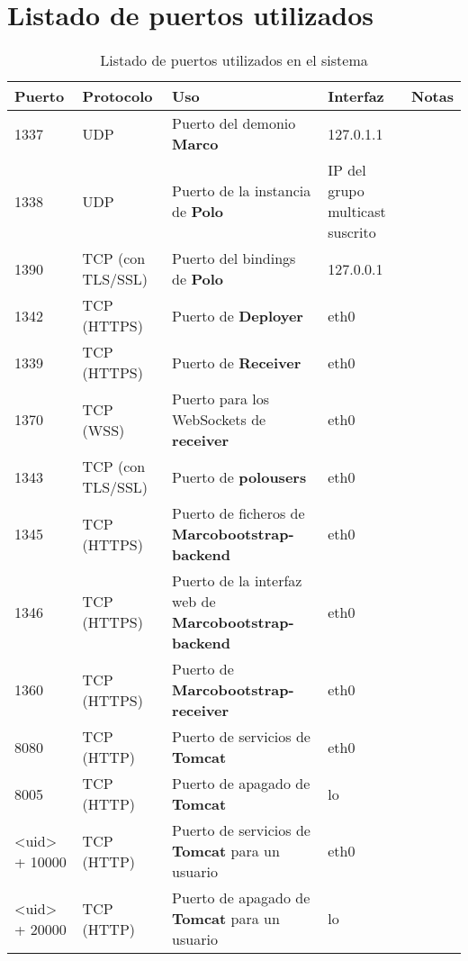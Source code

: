 \chapter{Listado de puertos utilizados}

\begin{table}[H]
\centering
\begin{tabular}{|p{1.5cm}|p{2.5cm}|p{5cm}|p{2.5cm}|l|}\hline
\textbf{Puerto}&\textbf{Protocolo}&\textbf{Uso}&\textbf{Interfaz}&\textbf{Notas}\\
\hline
1337&UDP&Puerto del demonio \textbf{Marco}&127.0.1.1&\\
\hline
1338&UDP&Puerto de la instancia de \textbf{Polo}&IP del grupo multicast suscrito&\\
\hline
1390&TCP (con TLS/SSL)&Puerto del bindings de \textbf{Polo}&127.0.0.1&\\
\hline
1342&TCP (HTTPS)&Puerto de \textbf{Deployer}&eth0&\\
\hline
1339&TCP (HTTPS)&Puerto de \textbf{Receiver}&eth0&\\
\hline
1370&TCP (WSS)&Puerto para los WebSockets de \textbf{receiver}&eth0&\\
\hline
1343&TCP (con TLS/SSL)&Puerto de \textbf{polousers}&eth0&\\
\hline
1345&TCP (HTTPS)&Puerto de ficheros de \textbf{Marcobootstrap-backend}&eth0&\\
\hline
1346&TCP (HTTPS)&Puerto de la interfaz web de \textbf{Marcobootstrap-backend}&eth0&\\
\hline
1360&TCP (HTTPS)&Puerto de \textbf{Marcobootstrap-receiver}&eth0&\\
\hline
8080&TCP (HTTP)&Puerto de servicios de \textbf{Tomcat}&eth0&\\
\hline
8005&TCP (HTTP)&Puerto de apagado de \textbf{Tomcat}&lo&\\
\hline
<uid> + 10000&TCP (HTTP)&Puerto de servicios de \textbf{Tomcat} para un usuario&eth0&\\
\hline
<uid> + 20000&TCP (HTTP)&Puerto de apagado de \textbf{Tomcat} para un usuario&lo&\\
\hline
\end{tabular}
\caption{Listado de puertos utilizados en el sistema}
\label{ports}
\end{table}